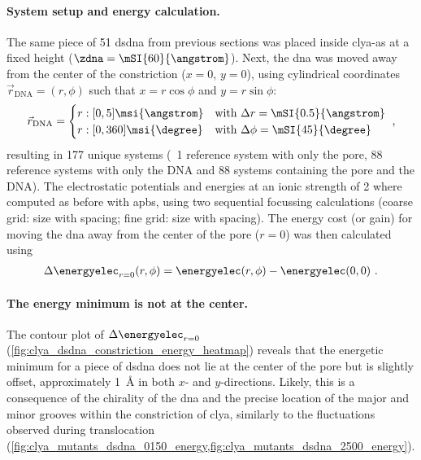 \paragraph{System setup and energy calculation.}
%
The same piece of \SI{51}{\bp} \gls{dsdna} from previous sections was placed inside \gls{clya-as} at a fixed
height ($\zdna = \mSI{60}{\angstrom}$). Next, the \gls{dna} was moved away from the center of the
constriction ($x = 0$, $y = 0$), using cylindrical coordinates $\vec{r}_{\mathrm{DNA}} = (r, \phi)$ such that
$x = r \cos{\phi}$ and $y = r \sin{\phi}$:
%
\begin{equation}
  \vec{r}_{\mathrm{DNA}} = %
  \begin{cases}
    r: [0,5] \msi{\angstrom} &\mbox{with } \Delta r    = \mSI{0.5}{\angstrom} \\
    r: [0,360] \msi{\degree} &\mbox{with } \Delta \phi = \mSI{45}{\degree} \\
  \end{cases}
  \text{ ,}
\end{equation}
%
resulting in 177 unique systems (\ie~1 reference system with only the pore, 88 reference systems with only the
DNA and 88 systems containing the pore and the DNA). The electrostatic potentials and energies at an ionic
strength of \SI{2}{\Molar} where computed as before with \gls{apbs}, using two sequential focussing
calculations (coarse grid:  size with
 spacing; fine grid:  size with
 spacing). The energy cost (or gain) for moving the \gls{dna} away from
the center of the pore ($r = 0$) was then calculated using
%
\begin{align}
  \Delta \energyelec_{r=0} (r, \phi) = \energyelec (r, \phi) - \energyelec (0,0)
  \text{  .}
\end{align}
%

\paragraph{The energy minimum is not at the center.}
%
The contour plot of $\Delta \energyelec_{r=0}$ (\cref{fig:clya_dsdna_constriction_energy_heatmap}) reveals
that the energetic minimum for a piece of \gls{dsdna} does not lie at the center of the pore but is slightly
offset, approximately \SI{1}{\angstrom} in both $x$- and $y$-directions. Likely, this is a consequence of the
chirality of the \gls{dna} and the precise location of the major and minor grooves within the constriction of
\gls{clya}, similarly to the fluctuations observed during translocation
(\cref{fig:clya_mutants_dsdna_0150_energy,fig:clya_mutants_dsdna_2500_energy}). 

